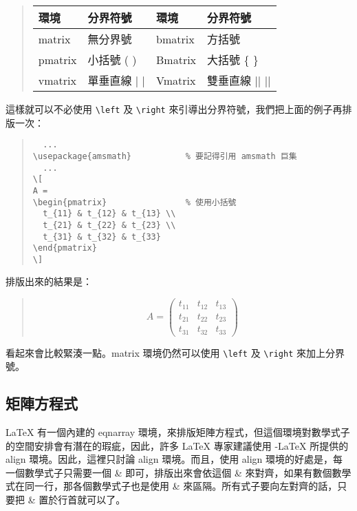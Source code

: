 \begin{quote}
  \begin{tabular}{>{\ttfamily }ll>{\ttfamily }ll}
    環境    & 分界符號                 & 環境    & 分界符號                   \\
    \hline
    matrix  & 無分界號                 & bmatrix & 方括號 {\ttfamily [ ]}     \\
    pmatrix & 小括號 {\ttfamily ( )}   & Bmatrix & 大括號 {\ttfamily \{ \}}   \\
    vmatrix & 單垂直線 {\ttfamily | |} & Vmatrix & 雙垂直線 {\ttfamily || ||}
  \end{tabular}
\end{quote}

這樣就可以不必使用 \verb|\left| 及 \verb|\right| 來引導出分界符號，我們把上面的例子再排版一次：

\begin{quote}
  \begin{verbatim}
  ...
\usepackage{amsmath}           % 要記得引用 amsmath 巨集
  ...
\[
A =
\begin{pmatrix}                % 使用小括號
  t_{11} & t_{12} & t_{13} \\
  t_{21} & t_{22} & t_{23} \\
  t_{31} & t_{32} & t_{33}
\end{pmatrix}
\]
\end{verbatim}
\end{quote}

排版出來的結果是：
\begin{quote}
  \[
    A =
    \begin{pmatrix}
      t_{11} & t_{12} & t_{13} \\
      t_{21} & t_{22} & t_{23} \\
      t_{31} & t_{32} & t_{33}
    \end{pmatrix}
  \]
\end{quote}
看起來會比較緊湊一點。{\ttfamily matrix} 環境仍然可以使用 \verb|\left| 及 \verb|\right| 來加上分界號。

\subsection{矩陣方程式}

\LaTeX{} 有一個內建的 {\ttfamily eqnarray} 環境，來排版矩陣方程式，但這個環境對數學式子的空間安排會有潛在的瑕疵，因此，許多 \LaTeX{} 專家建議使用 \AmS-\LaTeX{} 所提供的 {\ttfamily align} 環境。因此，這裡只討論 {\ttfamily align} 環境。而且，使用 {\ttfamily align} 環境的好處是，每一個數學式子只需要一個 {\ttfamily \&} 即可，排版出來會依這個 {\ttfamily \&} 來對齊，如果有數個數學式在同一行，那各個數學式子也是使用 {\ttfamily \&} 來區隔。所有式子要向左對齊的話，只要把 {\ttfamily \&} 置於行首就可以了。

